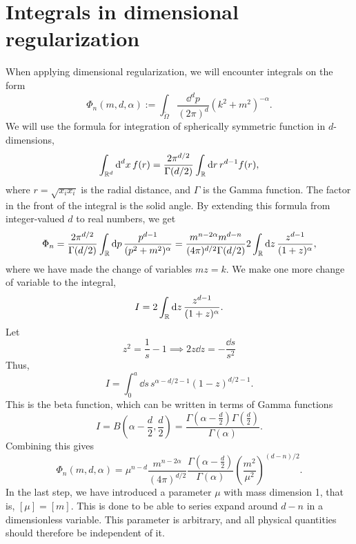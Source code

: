\section{Integrals in dimensional regularization}
\label{section: integral}


When applying dimensional regularization, we will encounter integrals on the form
%
\begin{equation}
    \label{def dimreg integral}
    \Phi_n(m, d, \alpha) 
    := \int_{\tilde \Omega} \frac{\dd^d p}{(2 \pi)^d} (k^2 + m^2)^{-\alpha}.
\end{equation}
%
We will use the formula for integration of spherically symmetric function in $d$-dimensions,
%
\begin{equation}
    \int_{\mathbb{R}^d} \text{d}^d x \, f(r) 
    = \frac{2 \pi^{d/2}}{\Gamma(d/2)} \int_{\mathbb{R}} \text{d} r \, r^{d-1}f(r),
\end{equation}
where $r = \sqrt{x_i x_i}$ is the radial distance, and $\Gamma$ is the Gamma function.
The factor in the front of the integral is the solid angle.
By extending this formula from integer-valued $d$ to real numbers, we get
%
\begin{equation}
    \Phi_n
    = \frac{2 \pi^{d/2} }{\Gamma(d/2)} \int_{\mathbb{R}} \text{d} p \, 
    \frac{p^{d-1}}{(p^2 + m^2)^\alpha}
    = \frac{m^{n-2\alpha}m^{d-n} }{(4 \pi)^{d / 2}\Gamma(d/2)} 
    2 \int_{\mathbb{R}} \text{d} z \, \frac{z^{d - 1}}{(1 + z)^\alpha}, 
\end{equation}
%
where we have made the change of variables $m z = k$.
We make one more change of variable to the integral,
%
\begin{equation}
    I = 2 \int_{\mathbb{R}} \text{d} z \, \frac{z^{d - 1}}{(1 + z)^\alpha}.
\end{equation}
%
Let
%
\begin{equation}
    z^2 = \frac{1}{s} - 1 \implies 2 z \dd z = - \frac{\dd s}{s^2}
\end{equation}
%
Thus,
%
\begin{equation}
    I = \int_0^a \dd s \, s^{\alpha - d/2 - 1} (1 - z)^{d/2 - 1}.
\end{equation}
%
This is the beta function, which can be written in terms of Gamma functions~\autocite{peskinIntroductionQuantumField1995}
%
\begin{equation}
    I = B\left(\alpha - \frac{d}{2}, \frac{d}{2}\right) 
    = \frac{\Gamma\left(\alpha - \frac{d}{2}\right) \Gamma\left(\frac{d}{2}\right)}{\Gamma(\alpha)}.
\end{equation}
%
Combining this gives
%
\begin{equation}
    \label{result dimreg}
    \Phi_n(m, d, \alpha) 
    = \mu^{n-d} \frac{m^{n - 2\alpha}}{(4 \pi)^{d / 2}}
    \frac{
        \Gamma \left(\alpha - \frac{d}{2} \right) 
    }
    {\Gamma(\alpha)}
    \left(\frac{m^2}{\mu^2}\right)^{(d-n)/2 }
    .
\end{equation}
%
In the last step, we have introduced a parameter $\mu$ with mass dimension 1, that is, $[\mu] = [m]$.
This is done to be able to series expand around $d - n$ in a dimensionless variable. 
This parameter is arbitrary, and all physical quantities should therefore be independent of it.



